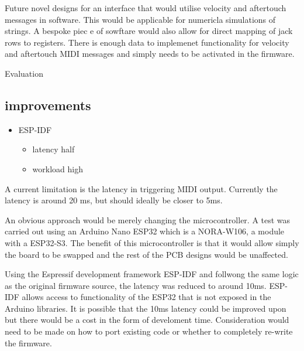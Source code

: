 Future novel designs for an interface that would utilise velocity and
aftertouch messages in software. This would be applicable for numericla
simulations of strings. A bespoke piec e of sowftare would also allow
for direct mapping of jack rows to registers. There is enough data to
implemenet functionality for velocity and aftertouch MIDI messages and
simply needs to be activated in the firmware.

Evaluation

\subsection{improvements}\label{improvements}

\begin{itemize}
\tightlist
\item
  ESP-IDF

  \begin{itemize}
  \tightlist
  \item
    latency half
  \item
    workload high
  \end{itemize}
\end{itemize}

A current limitation is the latency in triggering MIDI output. Currently
the latency is around 20 ms, but should ideally be closer to 5ms.

An obvious approach would be merely changing the microcontroller. A test
was carried out using an Arduino Nano ESP32 which is a NORA-W106, a
module with a ESP32-S3. The benefit of this microcontroller is that it
would allow simply the board to be swapped and the rest of the PCB
designs would be unaffected.

Using the Espressif development framework ESP-IDF and follwong the same
logic as the original firmware source, the latency was reduced to around
10ms. ESP-IDF allows access to functionality of the ESP32 that is not
exposed in the Arduino libraries. It is possible that the 10ms latency
could be improved upon but there would be a cost in the form of
develoment time. Consideration would need to be made on how to port
existing code or whether to completely re-write the firmware.

